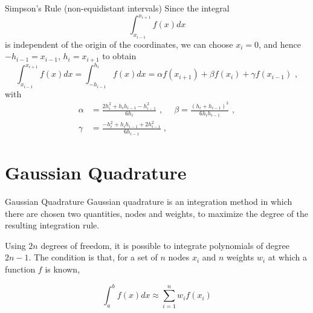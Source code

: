 \documentclass[11pt]{beamer}
\begin{document}
\begin{frame}[fragile]{Simpson's Rule (non-equidistant intervals)}
Since the integral
\begin{equation*}
\int_{x_{i-1}}^{x_{i+1}} f(x) dx
\end{equation*}
is independent of the origin of the coordinates, we can choose $x_i = 0$, and hence $-h_{i-1} = x_{i-1}$, $h_i = x_{i+1}$ to obtain
\begin{equation}
\int_{x_{i-1}}^{x_{i+1}} f(x) dx = \int_{-h_{i-1}}^{h_i} f(x) dx = \alpha f(x_{i+1})
+ \beta f(x_i) + \gamma f(x_{i-1})\,\,,
\end{equation}
with 
\begin{equation}
\begin{aligned}
\alpha &= \frac{2 h_i^2 + h_i h_{i-1} - h_{i-1}^2}{6 h_i}\,\,, 
&\beta = \frac{ (h_i + h_{i-1})^3 }{6 h_i h_{i-1}}\,\,,\\
\gamma &= \frac{-h_i^2 + h_i h_{i-1} + 2 h_{i-1}^2}{6 h_{i-1}} \; ,
\end{aligned}
\end{equation}
\end{frame}

\section{Gaussian Quadrature}
\begin{frame}[fragile]{Gaussian Quadrature}
Gaussian quadrature is an integration method in which there are chosen two quantities, nodes
and weights, to maximize the degree of the
resulting integration rule.\\
\pause
\bigskip
 
Using $2n$ degrees of freedom, it is possible to integrate
polynomials of degree $2n-1$. The condition is that, for a set of
$n$ nodes $x_i$ and $n$ weights $w_i$ at which a function $f$ is known,

\begin{equation}
\label{eq:gaussian1}
\int_a^b f(x) dx \approx \sum_{i=1}^{n} w_i f(x_i)
\end{equation}
\end{frame}
\end{document}

